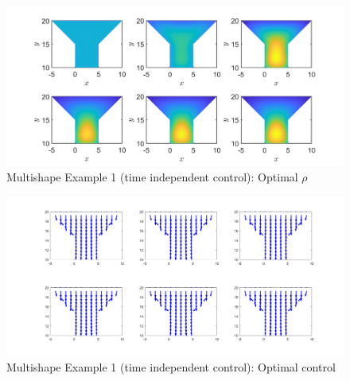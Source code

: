 \documentclass[11pt, a4paper]{article}
\theoremstyle{definition}
\begin{document}
\begin{figure}[h]
	\centering
	\includegraphics[scale=0.35]{MultiOpt1.png}
	\caption{Multishape Example 1 (time independent control): Optimal $\rho$} 
	\label{FM1}
\end{figure}
\begin{figure}[h]
	\centering
	\includegraphics[scale=0.35]{MultiCont1.png}
	\caption{Multishape Example 1 (time independent control): Optimal control} 
	\label{FM2}
\end{figure}











\pagebreak	


\end{document}
